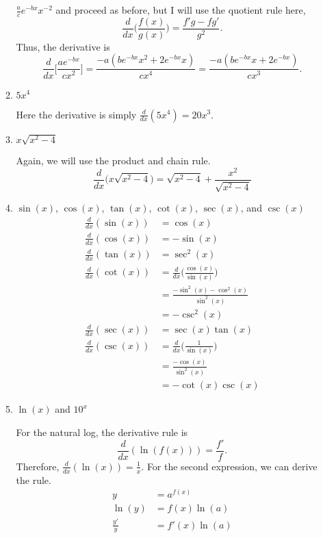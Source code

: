 \begin{enumerate}
\begin{enumerate}[label = (\alph*)]
    \(\frac{a}{c}e^{-bx}x^{-2}\) and proceed as before, but I will use the
    quotient rule here,
    \[
    \frac{d}{dx}\bigg(\frac{f(x)}{g(x)}\bigg) = \frac{f'g - fg'}{g^2}.
    \]
    Thus, the derivative is
    \[
    \frac{d}{dx}\bigg[\frac{ae^{-bx}}{cx^2}\bigg] =
    \frac{-a(be^{-bx}x^2 + 2e^{-bx}x)}{cx^4} =
    \frac{-a(be^{-bx}x + 2e^{-bx})}{cx^3}.
    \]
  \item
    \(5x^4\)
    \par\smallskip
    Here the derivative is simply \(\frac{d}{dx}(5x^4) = 20x^3\).
  \item
    \(x\sqrt{x^2 - 4}\)
    \par\smallskip
    Again, we will use the product and chain rule.
    \[
    \frac{d}{dx}\big(x\sqrt{x^2 - 4}\big) = \sqrt{x^2 - 4} +
    \frac{x^2}{\sqrt{x^2 - 4}}
    \]
  \item
    \(\sin(x)\), \(\cos(x)\), \(\tan(x)\), \(\cot(x)\), \(\sec(x)\), and
    \(\csc(x)\)
    \begin{align*}
      \frac{d}{dx}(\sin(x)) &= \cos(x)\\
      \frac{d}{dx}(\cos(x)) &= -\sin(x)\\
      \frac{d}{dx}(\tan(x)) &= \sec^2(x)\\
      \frac{d}{dx}(\cot(x))
      &= \frac{d}{dx}\bigg(\frac{\cos(x)}{\sin(x)}\bigg)\\
                            &= \frac{-\sin^2(x) - \cos^2(x)}{\sin^2(x)}\\
                            &= -\csc^2(x)\\
      \frac{d}{dx}(\sec(x)) &= \sec(x)\tan(x)\\
      \frac{d}{dx}(\csc(x)) &= \frac{d}{dx}\bigg(\frac{1}{\sin(x)}\bigg)\\
                            &= \frac{-\cos(x)}{\sin^2(x)}\\
                            &= -\cot(x)\csc(x)
    \end{align*}
  \item
    \(\ln(x)\) and \(10^x\)
    \par\smallskip
    For the natural log, the derivative rule is
    \[
    \frac{d}{dx}(\ln(f(x))) = \frac{f'}{f}.
    \]
    Therefore, \(\frac{d}{dx}(\ln(x)) = \frac{1}{x}\).
    For the second expression, we can derive the rule.
    \begin{align*}
      y &= a^{f(x)}\\
      \ln(y) &= f(x)\ln(a)\\
      \frac{y'}{y} &= f'(x)\ln(a)\\

\end{align*}
\end{enumerate}
\end{enumerate}
